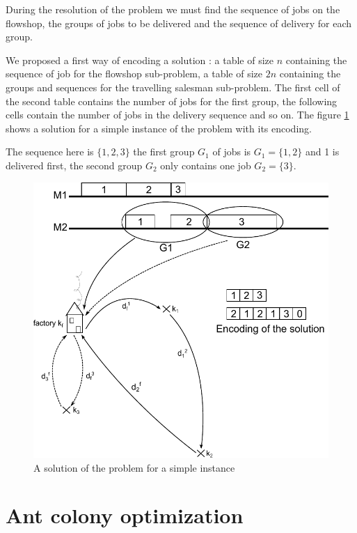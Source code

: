 \documentclass[UTF8, twoside]{EPURapport}
\begin{document}
	During the resolution of the problem we must find the sequence of jobs on the flowshop, the groups of jobs to be delivered and the sequence of delivery for each group.

	We proposed a first way of encoding a solution : a table of size $n$ containing the sequence of job for the flowshop sub-problem, a table of size $2n$ containing the groups and sequences for the travelling salesman sub-problem. The first cell of the second table contains the number of jobs for the first group, the following cells contain the number of jobs in the delivery sequence and so on. The figure \ref{problem} shows a solution for a simple instance of the problem with its encoding. 
	
	The sequence here is $\{1,2,3\}$ the first group $G_1$ of jobs is $G_1 = \{1,2\}$ and 1 is delivered first, the second group $G_2$ only contains one job $G_2 = \{3\}$.
	
	
\begin{figure}
	\centering \includegraphics{images/problem.pdf}
	\caption {A solution of the problem for a simple instance}	
	\label {problem}
\end{figure}

\chapter{Ant colony optimization}
\end{document}
